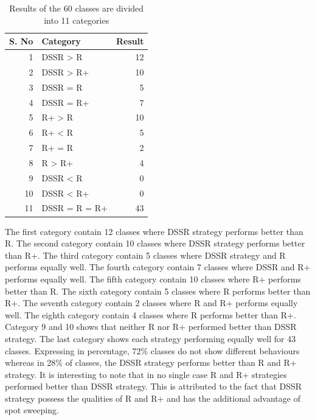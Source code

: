 \documentclass{acm_proc_article-sp}
\begin{document}
\begin{table}[h]
\caption{Results of the 60 classes are divided into 11 categories}
\centering
\begin{tabular}{|r|l|r|}
\hline
S. No	& 	Category			& 	Result\\
\hline
1		&	DSSR > R			&	12 \\	
2		&	DSSR > R+		&	10 \\	
3		&	DSSR = R			&	5 \\	
4		&	DSSR = R+		&	7 \\	
5		&	R+ > R 			&	10 \\	
6		&	R+ < R			&	5 \\	
7		&	R+ = R			&	2 \\	
8		&	R > R+			&	4 \\
9		&	DSSR < R			&	0 \\	
10		&	DSSR < R+		&	0 \\
11		&	DSSR = R = R+	&	43 \\			
\hline
\end{tabular}
\bigskip
\label{table:categories}
\end{table}









The first category contain 12 classes where DSSR strategy performs better than R. 
The second category contain 10 classes where DSSR strategy performs better than R+. 
The third category contain 5 classes where DSSR strategy and R performs equally well.
The fourth category contain 7 classes where DSSR and R+ performs equally well. 
The fifth category contain 10 classes where R+ performs better than R.
The sixth category contain 5 classes where R performs better than R+.
The seventh category contain 2 classes where R and R+ performs equally well.
The eighth category contain 4 classes where R performs better than R+.
Category 9 and 10 shows that neither R nor R+ performed better than DSSR strategy.
The last category shows each strategy performing equally well for 43 classes. Expressing in percentage, 72\% classes do not show different behaviours whereas in 28\% of classes, the DSSR strategy performs better than R and R+ strategy. It is interesting to note that in no single case R and R+ strategies performed better than DSSR strategy. This is attributed to the fact that DSSR strategy possess the qualities of R and R+ and has the additional advantage of spot sweeping.
\end{document}
